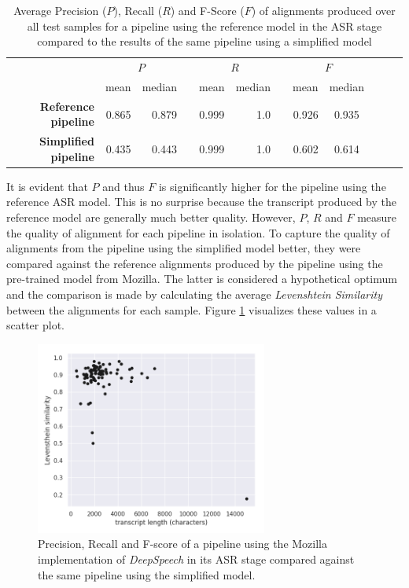 \documentclass[letterpaper]{article}
\begin{document}
\begin{table}[h!]
	\centering
	\begin{tabular}{@{}rrrrcrrrcrrr@{}}
		\toprule
		& \multicolumn{2}{c}{$P$} & \phantom{abc} & \multicolumn{2}{c}{$R$} & \phantom{abc} & \multicolumn{2}{c}{$F$} \\
		\cmidrule{2-3} \cmidrule{5-6} \cmidrule{8-9} 
		& mean & median && mean & median && mean & median\\ 
		\midrule
		\textbf{Reference pipeline} & 0.865 & 0.879 && 0.999 & 1.0 && 0.926 & 0.935 \\
		\textbf{Simplified pipeline} & 0.435 & 0.443 && 0.999 & 1.0 && 0.602 & 0.614 \\
		\bottomrule
	\end{tabular}
	\caption{Average Precision ($P$), Recall ($R$) and F-Score ($F$) of alignments produced over all test samples for a pipeline using the reference model in the ASR stage compared to the results of the same pipeline using a simplified model}
	\label{prf_en}
\end{table}

It is evident that $P$ and thus $F$ is significantly higher for the pipeline using the reference ASR model. This is no surprise because the transcript produced by the reference model are generally much better quality. However, $P$, $R$ and $F$ measure the quality of alignment for each pipeline in isolation. To capture the quality of alignments from the pipeline using the simplified model better, they were compared against the reference alignments produced by the pipeline using the pre-trained model from Mozilla. The latter is considered a hypothetical optimum and the comparison is made by calculating the average \textit{Levenshtein Similarity} between the alignments for each sample. Figure \ref{scatterplot_en} visualizes these values in a scatter plot.

\begin{figure}[!htb]
	\begin{center}
		\includegraphics[width=3in]{scatterplot_en.png}
		\caption{Precision, Recall and F-score of a pipeline using the Mozilla implementation of \textit{DeepSpeech} in its ASR stage compared against the same pipeline using the simplified model.}
		\label{scatterplot_en}
	\end{center}
\end{figure}
\end{document}
